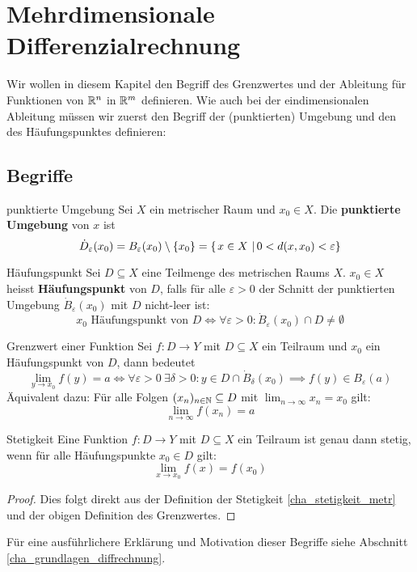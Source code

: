 \setcounter{chapter}{9}
\chapter{Mehrdimensionale Differenzialrechnung}

Wir wollen in diesem Kapitel den Begriff des Grenzwertes und der Ableitung für Funktionen von $\mathbb{R}^n$ in $\mathbb{R}^m$ definieren. Wie auch bei der eindimensionalen Ableitung müssen wir zuerst den Begriff der (punktierten) Umgebung und den des Häufungspunktes definieren:
\section{Begriffe}
\begin{definition}{punktierte Umgebung}{}
Sei $X$ ein metrischer Raum und $x_0\in X$. Die \textbf{punktierte Umgebung} von $x$ ist
$$\Dot{D}_\varepsilon(x_0) = B_\varepsilon(x_0) \setminus \{x_0\} = \left\{\left.x\in X \ \right| 0 < d(x, x_0) < \varepsilon \right\}$$
\end{definition}
\begin{definition}{Häufungspunkt}{}
Sei $D \subseteq X$ eine Teilmenge des metrischen Raums $X$. $x_0 \in X$ heisst \textbf{Häufungspunkt} von $D$, falls für alle $\varepsilon > 0$ der Schnitt der punktierten Umgebung $\Dot{B}_\varepsilon(x_0)$ mit $D$ nicht-leer ist:
$$x_0 \text{ Häufungspunkt von } D \iff \forall \varepsilon > 0: \Dot{B}_\varepsilon(x_0) \cap D \neq \emptyset$$
\end{definition}
\begin{definition}{Grenzwert einer Funktion}{}
Sei $f:D \to Y$ mit $D \subseteq X$ ein Teilraum und $x_0$ ein Häufungspunkt von $D$, dann bedeutet
$$\lim_{y\to x_0} f(y) = a \iff \forall \varepsilon > 0 \ \exists \delta>0: y \in D \cap \Dot{B}_\delta(x_0) \implies f(y) \in B_\varepsilon(a)$$
Äquivalent dazu: Für alle Folgen $(x_n)_{n \in \mathbb{N}} \subseteq D$ mit $\lim_{n \to \infty}x_n = x_0$ gilt:
$$\lim_{n \to \infty} f(x_n) = a$$
\end{definition}
\begin{korollar}{Stetigkeit}{}
Eine Funktion $f: D \to Y$ mit $D\subseteq X$ ein Teilraum ist genau dann stetig, wenn für alle Häufungspunkte $x_0 \in D$ gilt:
$$\lim_{x \to x_0} f(x) = f(x_0)$$
\end{korollar}
\begin{proof}
Dies folgt direkt aus der Definition der Stetigkeit \ref{cha_stetigkeit_metr} und der obigen Definition des Grenzwertes.
\end{proof}
Für eine ausführlichere Erklärung und Motivation dieser Begriffe siehe Abschnitt \ref{cha_grundlagen_diffrechnung}.

